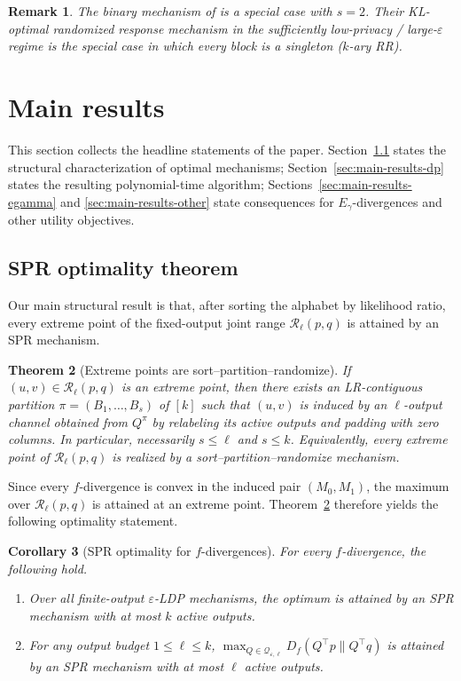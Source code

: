 \documentclass{article}
\theoremstyle{plain}
\newtheorem{theorem}{Theorem}[section]
\newtheorem{remark}[theorem]{Remark}
\newtheorem{corollary}[theorem]{Corollary}
\theoremstyle{definition}
\theoremstyle{plain}
\newcommand{\eps}{\varepsilon}
\begin{document}
\begin{remark}
The binary mechanism of \citet{Kairouz2016ExtremalMechanisms} is a special case with $s=2$. Their KL-optimal randomized response mechanism in the sufficiently low-privacy / large-$\eps$ regime is the special case in which every block is a singleton ($k$-ary RR).
\end{remark}

\section{Main results}
\label{sec:main-results-hub}

This section collects the headline statements of the paper. Section~\ref{sec:main-results-spr} states the structural characterization of optimal mechanisms; Section~\ref{sec:main-results-dp} states the resulting polynomial-time algorithm; Sections~\ref{sec:main-results-egamma} and \ref{sec:main-results-other} state consequences for $E_\gamma$-divergences and other utility objectives.

\subsection{SPR optimality theorem}
\label{sec:main-results-spr}

Our main structural result is that, after sorting the alphabet by likelihood ratio, every extreme point of the fixed-output joint range $\mathcal R_\ell(p,q)$ is attained by an SPR mechanism.

\begin{theorem}[Extreme points are sort--partition--randomize]
\label{thm:extreme-points-spr}
If $(u,v)\in\mathcal R_\ell(p,q)$ is an extreme point, then there exists an LR-contiguous partition $\pi=(B_1,\dots,B_s)$ of $[k]$ such that $(u,v)$ is induced by an $\ell$-output channel obtained from $Q^\pi$ by relabeling its active outputs and padding with zero columns. In particular, necessarily $s\le \ell$ and $s\le k$. Equivalently, every extreme point of $\mathcal R_\ell(p,q)$ is realized by a sort--partition--randomize mechanism.
\end{theorem}

Since every $f$-divergence is convex in the induced pair $(M_0,M_1)$, the maximum over $\mathcal R_\ell(p,q)$ is attained at an extreme point. Theorem~\ref{thm:extreme-points-spr} therefore yields the following optimality statement.

\begin{corollary}[SPR optimality for $f$-divergences]
\label{cor:fdiv-spr-optimality}
For every $f$-divergence, the following hold.
\begin{enumerate}
    \item Over all finite-output $\eps$-LDP mechanisms, the optimum is attained by an SPR mechanism with at most $k$ active outputs.
    \item For any output budget $1\le \ell\le k$, $\max_{Q\in\mathcal Q_{\eps,\ell}} D_f(Q^\top p\|Q^\top q)$ is attained by an SPR mechanism with at most $\ell$ active outputs.
\end{enumerate}
\end{corollary}
\end{document}
